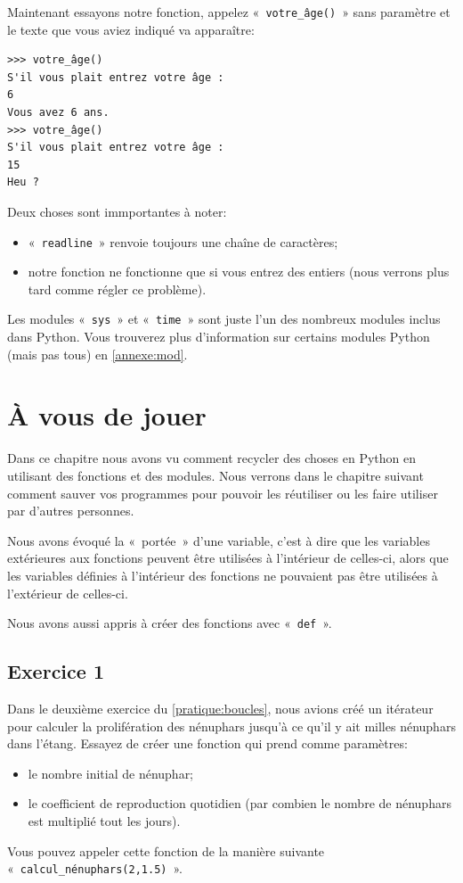 Maintenant essayons notre fonction, appelez  «~\texttt{votre\_âge()}~» sans paramètre et le texte que vous aviez indiqué va apparaître:

\begin{Verbatim}[frame=single,rulecolor=\color{mbleu}, label=à taper]
>>> votre_âge()
S'il vous plait entrez votre âge :
6
Vous avez 6 ans.
>>> votre_âge()
S'il vous plait entrez votre âge :
15
Heu ?
\end{Verbatim}

Deux choses sont immportantes à noter:
\begin{itemize}
\item «~\texttt{readline}~» renvoie toujours une chaîne de caractères;
\item notre fonction ne fonctionne que si vous entrez des entiers (nous verrons plus tard comme régler ce problème).
\end{itemize}

Les modules «~\texttt{sys}~»  et «~\texttt{time}~»  sont juste l'un des nombreux modules inclus dans Python. Vous trouverez plus d'information sur certains modules Python (mais pas tous) en \autoref{annexe:mod}.

\section{À vous de jouer\label{pratique:recyclage}}
Dans ce chapitre nous avons vu comment recycler des choses en Python en utilisant des fonctions et des modules.
Nous verrons dans le chapitre suivant comment sauver vos programmes pour pouvoir les réutiliser ou les faire utiliser par d'autres personnes.

Nous avons évoqué la «~portée~» d'une variable, c'est à dire que les variables extérieures aux fonctions peuvent être utilisées à l'intérieur de celles-ci, alors que les variables définies à l'intérieur des fonctions ne pouvaient pas être utilisées à l'extérieur de celles-ci.

Nous avons aussi appris à créer des fonctions avec «~\texttt{def}~».

\subsection{Exercice 1}
Dans le deuxième exercice du \autoref{pratique:boucles}, nous avions créé un itérateur pour calculer la prolifération des nénuphars jusqu'à ce qu'il y ait milles nénuphars dans l'étang.
Essayez de créer une fonction qui prend comme paramètres:
\begin{itemize}
\item le nombre initial de nénuphar;
\item le coefficient de reproduction quotidien (par combien le nombre de nénuphars est multiplié tout les jours).
\end{itemize}
Vous pouvez appeler cette fonction de la manière suivante «~\texttt{calcul\_nénuphars(2,1.5)}~».

